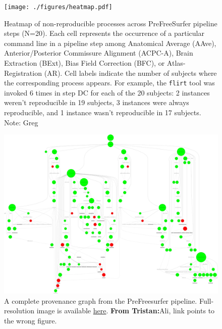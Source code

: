 \documentclass[a4paper,num-refs]{oup-contemporary}
\newcommand{\note}[2]{\color{blue}Note: #1\color{black}}
\newcommand{\tristan}[1]{\color{blue}\textbf{From Tristan:}#1\color{black}}
\newcommand{\flirt}[0]{\texttt{flirt}\xspace}
\begin{document}
\begin{figure}
\begin{minipage}{\linewidth}
\centering
  \texttt{[image: ./figures/heatmap.pdf]}
  \caption{Heatmap of non-reproducible processes across PreFreeSurfer pipeline steps (N=20). 
  Each cell represents the occurrence of a particular command line in a
  pipeline step among Anatomical Average (AAve), Anterior/Posterior
  Commissure Alignment (ACPC-A), Brain Extraction (BExt), Bias Field
  Correction (BFC), or Atlas-Registration (AR). Cell labels indicate the
  number of subjects where the corresponding process appears. For example,
  the \flirt tool was invoked 6 times in step DC for each of the 20
  subjects: 2 instances weren't reproducible in 19 subjects, 3
  instances were always reproducible, and 1 instance wasn't reproducible in
  17 subjects. \note{Greg}{colorbar doesn't match the numbers: it's from 0-1 but the numbers are 
  subject counts. I don't really have a preference on which, but harmonizing them to be the same unit should happen.}
        }
  \label{fig:pfs_heatmap}
\end{minipage}

\vspace*{1cm}

\begin{minipage}{\linewidth}
  \centering
    \includegraphics[width=\linewidth]{figures/pfs-labeled.png} 
    \caption{A complete provenance graph from the PreFreesurfer pipeline.
     Full-resolution image is available 
     \href{https://drive.google.com/file/d/1BKq5ZXIVr3bkij88SmeW7ulWOExSCm7n/view?usp=sharing}{here}. \tristan{Ali, link points to the wrong figure.}}
    \label{fig:complete_pfs}
\end{minipage}
\end{figure}
\end{document}
